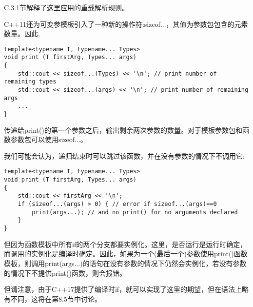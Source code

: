 C.3.1节解释了这里应用的重载解析规则。


C++11还为可变参模板引入了一种新的操作符:sizeof...，其值为参数包包含的元素数量。因此,

\begin{lstlisting}[style=styleCXX]
template<typename T, typename... Types>
void print (T firstArg, Types... args)
{
	std::cout << sizeof...(Types) << '\n'; // print number of remaining types
	std::cout << sizeof...(args) << '\n'; // print number of remaining args
	...
}
\end{lstlisting}

传递给print()的第一个参数之后，输出剩余两次参数的数量。对于模板参数包和函数参数包可以使用sizeof...。

我们可能会认为，递归结束时可以跳过该函数，并在没有参数的情况下不调用它:

\begin{lstlisting}[style=styleCXX]
template<typename T, typename... Types>
void print (T firstArg, Types... args)
{
	std::cout << firstArg << '\n';
	if (sizeof...(args) > 0) { // error if sizeof...(args)==0
		print(args...); // and no print() for no arguments declared
	}
}
\end{lstlisting}

但因为函数模板中所有if的两个分支都要实例化。这里，是否运行是运行时确定，而调用的实例化是编译时确定。因此，如果为一个(最后一个)参数使用print()函数模板，则调用print(args...)的语句在没有参数的情况下仍然会实例化，若没有参数的情况下不提供print()函数，则会报错。

但请注意，由于C++17提供了编译时if，就可以实现了这里的期望，但在语法上略有不同，这将在第8.5节中讨论。
























